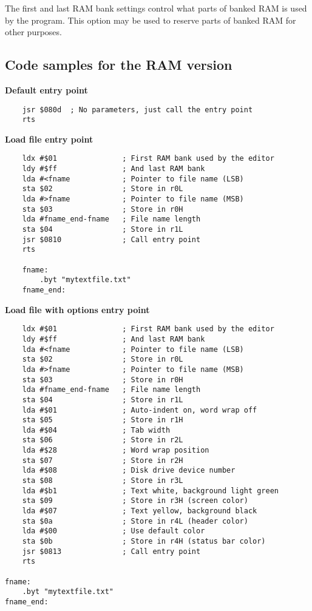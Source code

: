 \documentclass{article}
\begin{document}
        The first and last RAM bank settings control what parts of banked RAM is
        used by the program. This option may be used to reserve parts of banked RAM
        for other purposes.

    \subsection{Code samples for the RAM version}

    \textbf{Default entry point}
\begin{verbatim}
    jsr $080d  ; No parameters, just call the entry point
    rts
\end{verbatim}

    \textbf{Load file entry point}
\begin{verbatim}
    ldx #$01               ; First RAM bank used by the editor
    ldy #$ff               ; And last RAM bank
    lda #<fname            ; Pointer to file name (LSB)
    sta $02                ; Store in r0L
    lda #>fname            ; Pointer to file name (MSB)
    sta $03                ; Store in r0H
    lda #fname_end-fname   ; File name length
    sta $04                ; Store in r1L
    jsr $0810              ; Call entry point
    rts

    fname:
        .byt "mytextfile.txt"
    fname_end:
\end{verbatim}

\textbf{Load file with options entry point}
\begin{verbatim}
    ldx #$01               ; First RAM bank used by the editor
    ldy #$ff               ; And last RAM bank
    lda #<fname            ; Pointer to file name (LSB)
    sta $02                ; Store in r0L
    lda #>fname            ; Pointer to file name (MSB)
    sta $03                ; Store in r0H
    lda #fname_end-fname   ; File name length
    sta $04                ; Store in r1L
    lda #$01               ; Auto-indent on, word wrap off
    sta $05                ; Store in r1H
    lda #$04               ; Tab width
    sta $06                ; Store in r2L
    lda #$28               ; Word wrap position
    sta $07                ; Store in r2H
    lda #$08               ; Disk drive device number
    sta $08                ; Store in r3L
    lda #$b1               ; Text white, background light green
    sta $09                ; Store in r3H (screen color)
    lda #$07               ; Text yellow, background black
    sta $0a                ; Store in r4L (header color)
    lda #$00               ; Use default color
    sta $0b                ; Store in r4H (status bar color)
    jsr $0813              ; Call entry point
    rts

fname:
    .byt "mytextfile.txt"
fname_end:
\end{verbatim}
\end{document}
